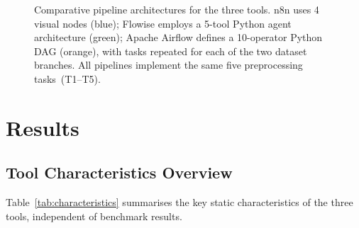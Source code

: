 \documentclass[journal]{IEEEtran}
\begin{document}
\begin{figure}[!t]
  \caption{Comparative pipeline architectures for the three tools.
    n8n uses 4 visual nodes (blue); Flowise employs a 5-tool Python agent
    architecture (green); Apache Airflow defines a 10-operator Python DAG
    (orange), with tasks repeated for each of the two dataset branches.
    All pipelines implement the same five preprocessing tasks~(T1--T5).}
  \label{fig:architecture}
\end{figure}


\section{Results}
\label{sec:results}

\subsection{Tool Characteristics Overview}

Table~\ref{tab:characteristics} summarises the key static characteristics
of the three tools, independent of benchmark results.
\end{document}
